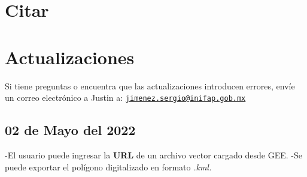 \documentclass[
]{book}
\begin{document}
\hypertarget{citar}{%
\chapter{Citar}\label{citar}}

\hypertarget{actualizaciones}{%
\chapter{Actualizaciones}\label{actualizaciones}}

Si tiene preguntas o encuentra que las actualizaciones introducen errores, envíe un correo electrónico a Justin a: \href{mailto:jimenez.sergio@inifap.gob.mx}{\nolinkurl{jimenez.sergio@inifap.gob.mx}}

\hypertarget{de-mayo-del-2022}{%
\section{02 de Mayo del 2022}\label{de-mayo-del-2022}}

-El usuario puede ingresar la \textbf{URL} de un archivo vector cargado desde GEE.
-Se puede exportar el polígono digitalizado en formato \emph{.kml.}

  
\end{document}
